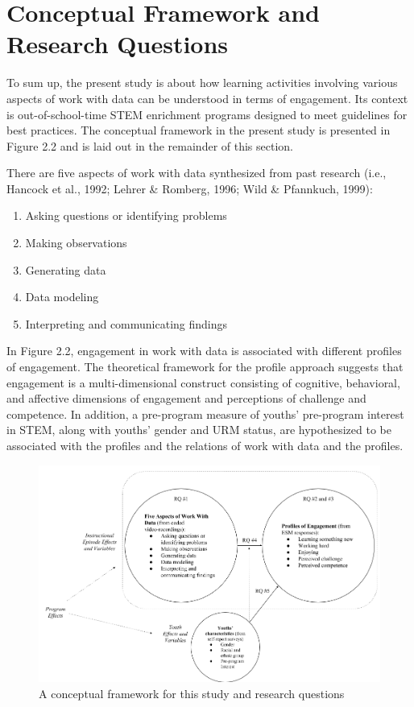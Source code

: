 \documentclass[]{msu-thesis}
\providecommand{\tightlist}{%
  \setlength{\itemsep}{0pt}\setlength{\parskip}{0pt}}
\theoremstyle{definition}
\theoremstyle{definition}
\theoremstyle{definition}
\theoremstyle{remark}
\begin{document}
\section{Conceptual Framework and Research
Questions}\label{conceptual-framework-and-research-questions}

To sum up, the present study is about how learning activities involving
various aspects of work with data can be understood in terms of
engagement. Its context is out-of-school-time STEM enrichment programs
designed to meet guidelines for best practices. The conceptual framework
in the present study is presented in Figure 2.2 and is laid out in the
remainder of this section.

There are five aspects of work with data synthesized from past research
(i.e., Hancock et al., 1992; Lehrer \& Romberg, 1996; Wild \& Pfannkuch,
1999):

\begin{enumerate}
\def\labelenumi{\arabic{enumi}.}
\tightlist
\item
  Asking questions or identifying problems
\item
  Making observations
\item
  Generating data
\item
  Data modeling
\item
  Interpreting and communicating findings
\end{enumerate}

In Figure 2.2, engagement in work with data is associated with different
profiles of engagement. The theoretical framework for the profile
approach suggests that engagement is a multi-dimensional construct
consisting of cognitive, behavioral, and affective dimensions of
engagement and perceptions of challenge and competence. In addition, a
pre-program measure of youths' pre-program interest in STEM, along with
youths' gender and URM status, are hypothesized to be associated with
the profiles and the relations of work with data and the profiles.

\begin{figure}

{\centering \includegraphics[width=0.8\linewidth]{images/figure2} 

}

\caption{A conceptual framework for this study and research questions}\label{fig:unnamed-chunk-2}
\end{figure}
\end{document}
